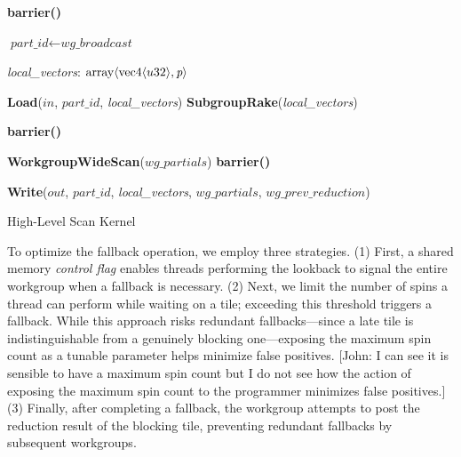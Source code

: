 \documentclass[sigconf]{acmart}
\newcommand{\john}[1]{{\footnotesize\color{cyan}[John: #1]}}
\begin{document}
\begin{algorithm}
  \small
  \SetAlgoLined

  \textbf{barrier()}\;

  $\textit{part\_id} \gets \textit{wg\_broadcast}$\;

  \textit{local\_vectors}: $\textnormal{array}\langle \textnormal{vec4}\langle u32\rangle, \textit{p} \rangle$\;

  \textbf{Load}($\textit{in}$, $\textit{part\_id}$, \textit{local\_vectors})\;
  \textbf{SubgroupRake}(\textit{local\_vectors})\;

  \textbf{barrier()}\;

  \textbf{WorkgroupWideScan}($\textit{wg\_partials}$)\;
  \textbf{barrier()}\;


  \textbf{Write}($\textit{out}$, $\textit{part\_id}$, \textit{local\_vectors}, $\textit{wg\_partials}$, $\textit{wg\_prev\_reduction}$)\;

  \caption{High-Level Scan Kernel}
\end{algorithm}

To optimize the fallback operation, we employ three strategies. (1) First, a shared memory \emph{control flag} enables threads performing the lookback to signal the entire workgroup when a fallback is necessary. (2) Next, we limit the number of spins a thread can perform while waiting on a tile; exceeding this threshold triggers a fallback. While this approach risks redundant fallbacks---since a late tile is indistinguishable from a genuinely blocking one---exposing the maximum spin count as a tunable parameter helps minimize false positives. \john{I can see it is sensible to have a maximum spin count but I do not see how the action of exposing the maximum spin count to the programmer minimizes false positives.} (3) Finally, after completing a fallback, the workgroup attempts to post the reduction result of the blocking tile, preventing redundant fallbacks by subsequent workgroups.
\end{document}
